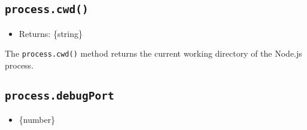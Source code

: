 \subsection{\texorpdfstring{\texttt{process.cwd()}}{process.cwd()}}\label{process.cwd}

\begin{itemize}
\tightlist
\item
  Returns: \{string\}
\end{itemize}

The \texttt{process.cwd()} method returns the current working directory
of the Node.js process.

\begin{Shaded}
\begin{Highlighting}[]
 \OperatorTok{;}

\NormalTok{(}\SpecialCharTok{$\{}\NormalTok{()}\SpecialCharTok{\}}\VerbatimStringTok{\textasciigrave{}}\NormalTok{)}\OperatorTok{;}
\end{Highlighting}
\end{Shaded}

\begin{Shaded}
\begin{Highlighting}[]
\OperatorTok{=} \NormalTok{(}\NormalTok{)}\OperatorTok{;}

\NormalTok{(}\SpecialCharTok{$\{}\NormalTok{()}\SpecialCharTok{\}}\VerbatimStringTok{\textasciigrave{}}\NormalTok{)}\OperatorTok{;}
\end{Highlighting}
\end{Shaded}

\subsection{\texorpdfstring{\texttt{process.debugPort}}{process.debugPort}}\label{process.debugport}

\begin{itemize}
\tightlist
\item
  \{number\}
\end{itemize}

